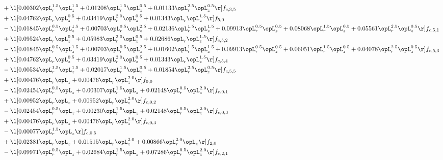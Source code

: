 \begin{alignat}{2}
& + \l[  0.00302 \opL_r^{1.5} \opL_z^{1.5} +  0.01208 \opL_r^{1.5} \opL_z^{0.5} +  0.01133 \opL_r^{2.5} \opL_z^{0.5}  \r] f_{c,3,5} \nonumber \\ 
& + \l[  0.04762 \opL_r \opL_z^{0.5} +  0.03419 \opL_r^{2.0} \opL_z^{0.5} +  0.01343 \opL_r \opL_z^{1.5}  \r] f_{5,0} \nonumber \\ 
& - \l[  0.01845 \opL_r^{0.5} \opL_z^{1.5} +  0.00703 \opL_r^{0.5} \opL_z^{2.5} +  0.02136 \opL_r^{1.5} \opL_z^{1.5} +  0.09913 \opL_r^{0.5} \opL_z^{0.5} +  0.08068 \opL_r^{1.5} \opL_z^{0.5} +  0.05561 \opL_r^{2.5} \opL_z^{0.5}  \r] f_{c,5,1} \nonumber \\ 
& + \l[  0.09524 \opL_r \opL_z^{0.5} +  0.05983 \opL_r^{2.0} \opL_z^{0.5} +  0.02686 \opL_r \opL_z^{1.5}  \r] f_{c,5,2} \nonumber \\ 
& - \l[  0.01845 \opL_r^{0.5} \opL_z^{1.5} +  0.00703 \opL_r^{0.5} \opL_z^{2.5} +  0.01602 \opL_r^{1.5} \opL_z^{1.5} +  0.09913 \opL_r^{0.5} \opL_z^{0.5} +  0.06051 \opL_r^{1.5} \opL_z^{0.5} +  0.04078 \opL_r^{2.5} \opL_z^{0.5}  \r] f_{c,5,3} \nonumber \\ 
& + \l[  0.04762 \opL_r \opL_z^{0.5} +  0.03419 \opL_r^{2.0} \opL_z^{0.5} +  0.01343 \opL_r \opL_z^{1.5}  \r] f_{c,5,4} \nonumber \\ 
& - \l[  0.00534 \opL_r^{1.5} \opL_z^{1.5} +  0.02017 \opL_r^{1.5} \opL_z^{0.5} +  0.01854 \opL_r^{2.5} \opL_z^{0.5}  \r] f_{c,5,5} \nonumber \\ 
& + \l[  0.00476 \opL_r \opL_z +  0.00476 \opL_r \opL_z^{2.0}  \r] f_{0,0} \nonumber \\ 
& - \l[  0.02454 \opL_r^{0.5} \opL_z +  0.00307 \opL_r^{1.5} \opL_z +  0.02148 \opL_r^{0.5} \opL_z^{2.0}  \r] f_{c,0,1} \nonumber \\ 
& + \l[  0.00952 \opL_r \opL_z +  0.00952 \opL_r \opL_z^{2.0}  \r] f_{c,0,2} \nonumber \\ 
& - \l[  0.02454 \opL_r^{0.5} \opL_z +  0.00230 \opL_r^{1.5} \opL_z +  0.02148 \opL_r^{0.5} \opL_z^{2.0}  \r] f_{c,0,3} \nonumber \\ 
& + \l[  0.00476 \opL_r \opL_z +  0.00476 \opL_r \opL_z^{2.0}  \r] f_{c,0,4} \nonumber \\ 
& - \l[  0.00077 \opL_r^{1.5} \opL_z  \r] f_{c,0,5} \nonumber \\ 
& + \l[  0.02381 \opL_r \opL_z +  0.01515 \opL_r \opL_z^{2.0} +  0.00866 \opL_r^{2.0} \opL_z  \r] f_{2,0} \nonumber \\ 
& - \l[  0.09971 \opL_r^{0.5} \opL_z +  0.02684 \opL_r^{1.5} \opL_z +  0.07286 \opL_r^{0.5} \opL_z^{2.0}  \r] f_{c,2,1} \nonumber \\ 

\end{alignat}
